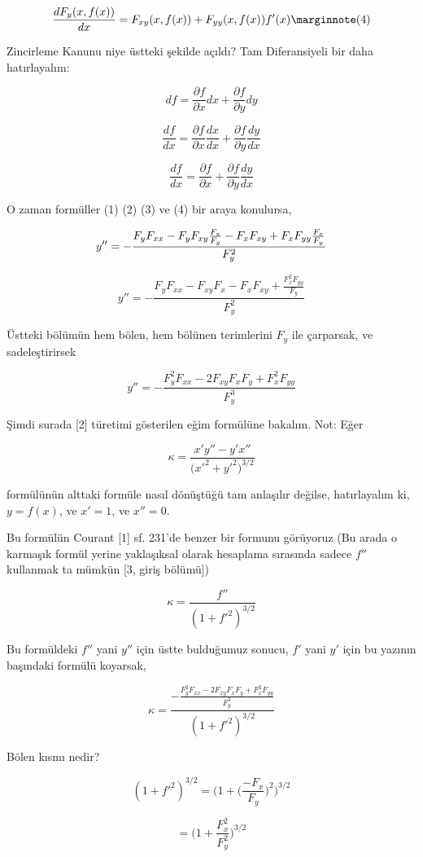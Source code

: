 \documentclass[12pt,fleqn]{article}\usepackage{../../common}
\begin{document}
$$
\frac{d F_y(x,f(x)) }{dx} =  F_{xy}(x,f(x))+F_{yy}(x,f(x))f'(x) 
\mlabel{4}
$$

Zincirleme Kanunu niye üstteki şekilde açıldı? Tam Diferansiyeli bir daha
hatırlayalım:

$$ df = \frac{\partial f}{\partial x} dx + \frac{\partial f}{\partial y} dy  $$

$$ \frac{df}{dx} = \frac{\partial f}{\partial x} \frac{dx}{dx} + \frac{\partial f}{\partial y} \frac{dy}{dx}  $$

$$ \frac{df}{dx} = \frac{\partial f}{\partial x} + \frac{\partial f}{\partial y} \frac{dy}{dx}  $$

O zaman formüller (1) (2) (3) ve (4) bir araya konulursa,

$$ y '' = - \frac{F_yF_{xx} - F_y F_{xy}\frac{F_x}{F_y} - F_xF_{xy} + F_xF_{yy}\frac{F_x}{F_y}}{F_y^2}\\ $$

$$ y '' = - \frac{F_yF_{xx} - F_{xy}F_x - F_xF_{xy} + \frac{F_x^2F_{yy}}{F_y}}{F_y^2} $$

Üstteki bölümün hem bölen, hem bölünen terimlerini $F_y$ ile çarparsak, ve
sadeleştirirsek

$$ y '' = - \frac{F_y^2F_{xx} - 2F_{xy}F_xF_y + F_x^2F_{yy}}{F_y^3} $$

Şimdi surada [2] türetimi gösterilen eğim  formülüne
bakalım. Not: Eğer

$$ \kappa = \frac{x'y''-y'x''}{\bigg(x'^2 + y'^2 \bigg)^{3/2}} $$

formülünün alttaki formüle nasıl dönüştüğü tam anlaşılır değilse,
hatırlayalım ki, $y=f(x)$, ve $x'=1$, ve $x'' = 0$.

Bu formülün Courant [1] sf. 231'de benzer bir formunu görüyoruz (Bu arada o
karmaşık formül yerine yaklaşıksal olarak hesaplama sırasında sadece $f''$
kullanmak ta mümkün [3, giriş bölümü])

$$ \kappa = \frac{f''}{(1+f'^2)^{3/2}} $$

Bu formüldeki $f''$ yani $y''$ için üstte bulduğumuz sonucu, $f'$ yani $y'$
için bu yazının başındaki formülü koyarsak,

$$ 
\kappa = \frac
{-\frac
{\displaystyle F_y^2F_{xx} - 2F_{xy}F_xF_y +  F_x^2F_{yy}}{\displaystyle F_y^3}}
{(1+f'^2)^{3/2}} 
$$  

Bölen kısmı nedir?

$$ (1+f'^2)^{3/2} = \bigg( 1 + \bigg(\frac{-F_x}{F_y}\bigg)^2 \bigg)^{3/2}  $$

$$ = \bigg( 1 + \frac{F_x^2}{F_y^2} \bigg)^{3/2}  $$
\end{document}
